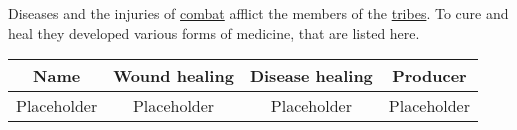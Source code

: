 \section{}\label{ch:Goods:Medicine}

Diseases and the injuries of \hyperref[ch:Conflict:Combat]{combat} afflict the
members of the \hyperref[ch:Tribes]{tribes}. To cure and heal they developed
various forms of medicine, that are listed here.

\begin{longtable}{cccc}
	\toprule
	Name        & Wound healing & Disease healing & Producer    \\
	\midrule
	Placeholder & Placeholder   & Placeholder     & Placeholder \\
	\bottomrule
\end{longtable}
